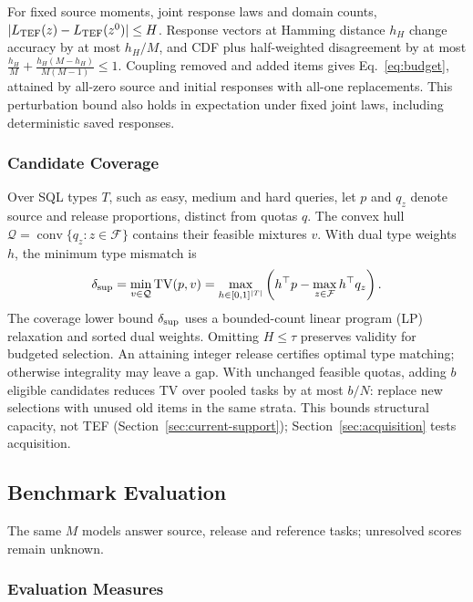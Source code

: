For fixed source moments, joint response laws and domain counts, $|L_{\mathrm{TEF}}(z)-L_{\mathrm{TEF}}(z^0)|\le H$. Response vectors at Hamming distance $h_H$ change accuracy by at most $h_H/M$, and CDF plus half-weighted disagreement by at most $\frac{h_H}M+\frac{h_H(M-h_H)}{M(M-1)}\le1$. Coupling removed and added items gives Eq.~\eqref{eq:budget}, attained by all-zero source and initial responses with all-one replacements. This perturbation bound also holds in expectation under fixed joint laws, including deterministic saved responses.


\subsubsection{Candidate Coverage}\label{sec:pool-diagnostic}

Over SQL types $T$, such as easy, medium and hard queries, let $p$ and $q_z$ denote source and release proportions, distinct from quotas $q$. The convex hull $\mathcal Q=\operatorname{conv}\{q_z:z\in\mathcal F\}$ contains their feasible mixtures $v$. With dual type weights $h$, the minimum type mismatch is
\begin{equation}
\delta_{\rm sup}=\min_{v\in\mathcal Q}\operatorname{TV}(p,v)
=\max_{h\in[0,1]^{|T|}}\left(h^\top p-\max_{z\in\mathcal F}h^\top q_z\right).
\end{equation}
The coverage lower bound $\delta_{\rm sup}$ uses a bounded-count linear program (LP) relaxation and sorted dual weights. Omitting $H\le\tau$ preserves validity for budgeted selection. An attaining integer release certifies optimal type matching; otherwise integrality may leave a gap. With unchanged feasible quotas, adding $b$ eligible candidates reduces TV over pooled tasks by at most $b/N$: replace new selections with unused old items in the same strata. This bounds structural capacity, not TEF (Section~\ref{sec:current-support}); Section~\ref{sec:acquisition} tests acquisition.


\subsection{Benchmark Evaluation}\label{sec:measurement-stage}
The same $M$ models answer source, release and reference tasks; unresolved scores remain unknown.

\subsubsection{Evaluation Measures}\label{sec:objectives}

